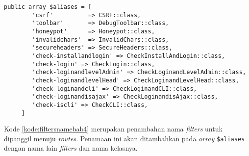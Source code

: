 \begin{lstlisting}[caption=Penambahan nama \textit{filters} untuk didefinisikan menuju \textit{routes}, label=kode:filtersnamebab4]
	public array $aliases = [
        'csrf'          => CSRF::class,
        'toolbar'       => DebugToolbar::class,
        'honeypot'      => Honeypot::class,
        'invalidchars'  => InvalidChars::class,
        'secureheaders' => SecureHeaders::class,
        'check-installandlogin' => CheckInstallAndLogin::class,
        'check-login' => CheckLogin::class,
        'check-loginandlevelAdmin' => CheckLoginandLevelAdmin::class,
        'check-loginandlevelHead' => CheckLoginandLevelHead::class,
        'check-loginandcli' => CheckLoginandCLI::class,
        'check-loginandisajax' => CheckLoginandisAjax::class,
        'check-iscli' => CheckCLI::class,
     ]
\end{lstlisting}

Kode \ref{kode:filtersnamebab4} merupakan penambahan nama \textit{filters} untuk dipanggil menuju \textit{routes}. Penamaan ini akan ditambahkan pada \textit{array} \verb|$aliases| dengan nama lain \textit{filters} dan nama kelasnya.
